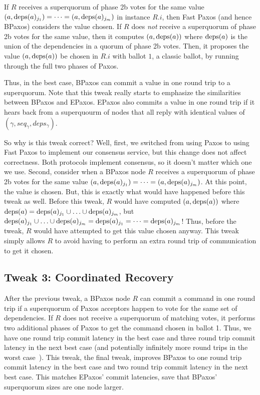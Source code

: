 \documentclass{mwhittaker}
\begin{document}
If $R$ receives a superquorum of phase 2b votes for the same value $(a,
\text{deps}(a)_{j_1}) = \cdots = (a, \text{deps}(a)_{j_{m}})$ in instance $R.i$, then Fast
Paxos (and hence BPaxos) considers the value chosen. If $R$ does \emph{not}
receive a superquorum of phase 2b votes for the same value, then it computes
$(a, \text{deps}(a))$ where $\text{deps}(a)$ is the union of the dependencies in a quorum
of phase 2b votes. Then, it proposes the value $(a, \text{deps}(a))$ be chosen in
$R.i$ with ballot $1$, a classic ballot, by running through the full two phases
of Paxos.

Thus, in the best case, BPaxos can commit a value in one round trip to a
superquorum. Note that this tweak really starts to emphasize the similarities
between BPaxos and EPaxos. EPaxos also commits a value in one round trip if it
hears back from a superquourm of nodes that all reply with identical values of
$(\gamma, seq_\gamma, deps_\gamma)$.

So why is this tweak correct? Well, first, we switched from using Paxos to
using Fast Paxos to implement our consensus service, but this change does not
affect correctness. Both protocols implement consensus, so it doesn't matter
which one we use. Second, consider when a BPaxos node $R$ receives a
superquorum of phase 2b votes for the same value $(a, \text{deps}(a)_{j_1}) = \cdots
= (a, \text{deps}(a)_{j_{m}})$. At this point, the value is chosen. But, this is
exactly what would have happened before this tweak as well. Before this tweak,
$R$ would have computed $(a, \text{deps}(a))$ where $\text{deps}(a) = \text{deps}(a)_{j_1} \cup
\ldots \cup \text{deps}(a)_{j_{m}}$, but $\text{deps}(a)_{j_1} \cup \ldots \cup
\text{deps}(a)_{j_{m}} = \text{deps}(a)_{j_1} = \cdots = \text{deps}(a)_{j_m}$! Thus, before the
tweak, $R$ would have attempted to get this value chosen anyway. This tweak
simply allows $R$ to avoid having to perform an extra round trip of
communication to get it chosen.

\subsection{Tweak 3: Coordinated Recovery}
After the previous tweak, a BPaxos node $R$ can commit a command in one round
trip if a superquorum of Paxos acceptors happen to vote for the same set of
dependencies. If $R$ does not receive a superquorum of matching votes, it
performs two additional phases of Paxos to get the command chosen in ballot 1.
Thus, we have one round trip commit latency in the best case and three round
trip commit latency in the next best case (and potentially infinitely more
round trips in the worst case~\cite{fischer1982impossibility}). This tweak, the
final tweak, improves BPaxos to one round trip commit latency in the best case
and two round trip commit latency in the next best case. This matches EPaxos'
commit latencies, save that BPaxos' superquorum sizes are one node larger.
\end{document}
